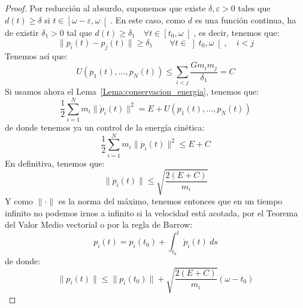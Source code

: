 \begin{teo}
\begin{proof}
        \noindent
        Por reducción al absurdo, suponemos que existe $\delta,\varepsilon>0$ tales que $d(t)\geq \delta$ si $t\in \left[\omega-\varepsilon,\omega\right[$. En este caso, como $d$ es una función continua, ha de existir $\delta_1>0$ tal que $d(t)\geq \delta_1\quad \forall t\in \left[t_0,\omega\right[$, es decir, tenemos que:
        \begin{equation*}
            \|p_i(t) - p_j(t)\| \geq \delta_1 \qquad \forall t\in \left]t_0,\omega\right[, \quad i<j
        \end{equation*}
        Tenemos así que:
        \begin{equation*}
            U(p_1(t),\ldots,p_N(t)) \leq \sum_{i<j} \frac{Gm_im_j}{\delta_1} = C
        \end{equation*}
        Si usamos ahora el Lema~\ref{Lema:conservacion_energia}, tenemos que:
        \begin{equation*}
            \frac{1}{2}\sum_{i=1}^{N}m_i \|\dot{p}_i(t)\|^2 = E + U(p_1(t),\ldots,p_N(t))
        \end{equation*}
        de donde tenemos ya un control de la energía cinética:
        \begin{equation*}
            \frac{1}{2}\sum_{i=1}^{N}m_i\|\dot{p}_i(t)\|^2 \leq E + C
        \end{equation*}
        En definitiva, tenemos que:
        \begin{equation*}
            \|\dot{p}_i(t)\| \leq \sqrt{\frac{2(E+C)}{m_i}}
        \end{equation*}
        Y como $\|\cdot \|$ es la norma del máximo, tenemos entonces que en un tiempo infinito no podemos irnos a infinito si la velocidad está acotada, por el Teorema del Valor Medio vectorial o por la regla de Barrow:
        \begin{equation*}
            p_i(t) = p_i(t_0) + \int_{t_0}^{t} \dot{p}_i(t)~ds 
        \end{equation*}
        de donde:
        \begin{equation*}
            \|p_i(t)\| \leq \|p_i(t_0)\| + \sqrt{\frac{2(E+C)}{m_i}}(\omega-t_0)
        \end{equation*}
    \end{proof}
\end{teo}


